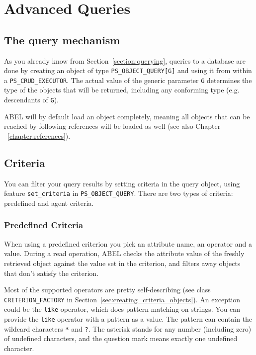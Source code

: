 \documentclass[a4paper,12pt]{report}
\begin{document}
\chapter{Advanced Queries}
\label{sec:advanced_queries}

\section{The query mechanism}

As you already know from Section~\ref{section:querying}, queries to a database are done by creating an object of type  \lstinline!PS_OBJECT_QUERY[G]! and using it from within a \lstinline!PS_CRUD_EXECUTOR!.
The actual value of the generic parameter \lstinline!G! determines the type of the objects that will be returned, including any conforming type (e.g. descendants of \lstinline!G!).

ABEL will by default load an object completely, meaning all objects that can be reached by following references will be loaded as well (see also Chapter ~\ref{chapter:references}).

\section{Criteria}

You can filter your query results by setting criteria in the query object, using feature \lstinline{set_criteria} in \lstinline{PS_OBJECT_QUERY}.
There are two types of criteria: predefined and agent criteria.

\subsection{Predefined Criteria}
When using a predefined criterion you pick an attribute name, an operator and a value. 
During a read operation, ABEL checks the attribute value of the freshly retrieved object against the value set in the criterion, and filters away objects that don't satisfy the criterion.

Most of the supported operators are pretty self-describing (see class \lstinline{CRITERION_FACTORY} in Section~\ref{sec:creating_criteria_objects}).
An exception could be the \lstinline!like! operator, which does pattern-matching on strings.
You can provide the \lstinline!like! operator with a pattern as a value. The pattern can contain the wildcard characters \lstinline!*! and \lstinline!?!.
The asterisk stands for any number (including zero) of undefined characters, and the question mark means exactly one undefined character.
\end{document}
